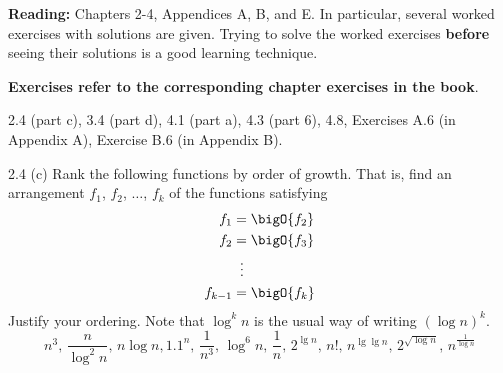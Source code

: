\documentclass[final]{article}
\begin{document}
\begin{tcolorbox}
    \textbf{Reading:} Chapters 2-4, Appendices A, B, and E. In particular, several worked exercises with solutions are given. Trying to solve
    the worked exercises \textbf{before} seeing their solutions is a good learning technique.

    \begin{tcolorbox}[colback=blue!5!white,colframe=blue!75!black]
        \textbf{Exercises refer to the corresponding chapter exercises in the book}.

        2.4 (part c), 3.4 (part d), 4.1 (part a), 4.3 (part 6), 4.8, Exercises  A.6 (in Appendix A), Exercise B.6 (in Appendix B).
    \end{tcolorbox}
\end{tcolorbox}
\newpage
\begin{exercise}{2.4 (c)}
    Rank the following functions by order of growth. That is,
    find an arrangement $f_1$, $f_2$, $\dots$, $f_k$ of the functions satisfying
    \begin{align*}
        f_1       & = \bigO{f_2}       \\
        f_2       & = \bigO{f_3}       \\
                  & \phantom{..}\vdots \\
        f_{k - 1} & = \bigO{f_k}
    \end{align*}
    Justify your ordering.
    Note that $\log^k{n}$ is the usual way of writing $(\log n)^k$.
    \[n^3,\, \frac{n}{\log^2 n},\, n \log n, 1.1^n,\,
        \frac{1}{n^3},\, \log^{6} n,\, \frac{1}{n},\,
        2^{\lg n},\, n!,\, n^{\lg {\lg n}},\, 2^{\sqrt{\log n}},\,
        n^{\frac{1}{\log n}}\]
\end{exercise}
\end{document}
